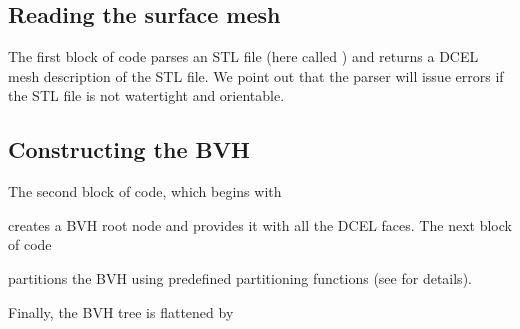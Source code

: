 \documentclass[letterpaper,10pt,english]{sphinxmanual}
\begin{document}
\subsection{Reading the surface mesh}
\label{\detokenize{Example_Basic:reading-the-surface-mesh}}
\sphinxAtStartPar
The first block of code parses an STL file (here called ) and returns a DCEL mesh description of the STL file.
We point out that the parser will issue errors if the STL file is not watertight and orientable.


\subsection{Constructing the BVH}
\label{\detokenize{Example_Basic:constructing-the-bvh}}
\sphinxAtStartPar
The second block of code, which begins with

\begin{sphinxVerbatim}[commandchars=\\\{\}]
\end{sphinxVerbatim}

\sphinxAtStartPar
creates a BVH root node and provides it with all the DCEL faces.
The next block of code

\begin{sphinxVerbatim}[commandchars=\\\{\}]

\end{sphinxVerbatim}

\sphinxAtStartPar
partitions the BVH using pre\sphinxhyphen{}defined partitioning functions (see {\hyperref[\detokenize{ImplemDCEL:chap-bvhintegration}]{}} for details).

\sphinxAtStartPar
Finally, the BVH tree is flattened by
\end{document}
